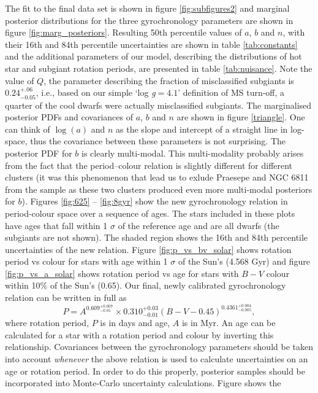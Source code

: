 \documentclass[11pt,preprint]{aastex}
\newcommand{\logg}{log \emph{g}}
\newcommand{\gyroa}{0.310}
\newcommand{\aerrp}{0.03}
\newcommand{\aerrm}{0.01}
\newcommand{\gyron}{0.609}
\newcommand{\nerrp}{0.007}
\newcommand{\nerrm}{0.01}
\newcommand{\gyrob}{0.4361}
\newcommand{\berrp}{0.004}
\newcommand{\berrm}{0.005}
\begin{document}
The fit to the final data set is shown in figure \ref{fig:subfigures2} and
marginal posterior distributions for the three gyrochronology parameters are
shown in figure \ref{fig:marg_posteriors}.
Resulting 50th percentile values of $a$, $b$ and $n$, with their 16th and 84th
percentile uncertainties are shown in table \ref{tab:constants} and the
additional parameters of our model, describing the distributions of hot star
and subgiant rotation periods, are presented in table \ref{tab:nuisance}.
Note the value of $Q$, the parameter describing the fraction of misclassified
subgiants is $0.24^{+.06}_{-0.05}$, i.e., based on our simple `\logg$=4.1$'
definition of MS turn-off, a quarter of the cool dwarfs were actually
misclassified subgiants.
The marginalised posterior PDFs and covariances of $a$, $b$ and $n$ are shown
in figure \ref{triangle}.
One can think of $\log(a)$ and $n$ as the slope and intercept of a straight
line in log-space, thus the covariance between these parameters is not
surprising.
The posterior PDF for $b$ is clearly multi-modal.
This multi-modality probably arises from the fact that the period--colour
relation is slightly different for different clusters (it was this phenomenon
that lead us to exlude Praesepe and NGC 6811 from the sample as these two
clusters produced even more multi-modal posteriors for $b$).
Figures \ref{fig:625} -- \ref{fig:8gyr} show the new gyrochronology relation
in period-colour space over a sequence of ages.
The stars included in these plots have ages that fall within 1 $\sigma$ of the
reference age and are all dwarfs (the subgiants are not shown).
The shaded region shows the 16th and 84th percentile uncertainties of the new
relation.
Figure \ref{fig:p_vs_bv_solar} shows rotation period vs colour for stars with
age within 1 $\sigma$ of the Sun's (4.568 Gyr) and figure
\ref{fig:p_vs_a_solar} shows rotation period vs age for stars with $B-V$
colour within 10\% of the Sun's (0.65).
Our final, newly calibrated gyrochronology relation can be written in full as
\begin{equation}
	P = A^{\gyron^{+\nerrp}_{-\nerrm}} \times \gyroa^{+\aerrp}_{-\aerrm}
	(B-V-0.45)^{\gyrob^{+\berrp}_{-\berrm}},
\label{eq:Barnes2007_3}
\end{equation}
where rotation period, $P$ is in days and age, $A$ is in Myr.
An age can be calculated for a star with a rotation period and colour by
inverting this relationship.
Covariances between the gyrochronology parameters should
be taken into account {\it whenever} the above relation is used to calculate
uncertainties on an age or rotation period.
In order to do this properly, posterior samples should be incorporated into
Monte-Carlo uncertainty calculations.
Figure  shows the
\end{document}
